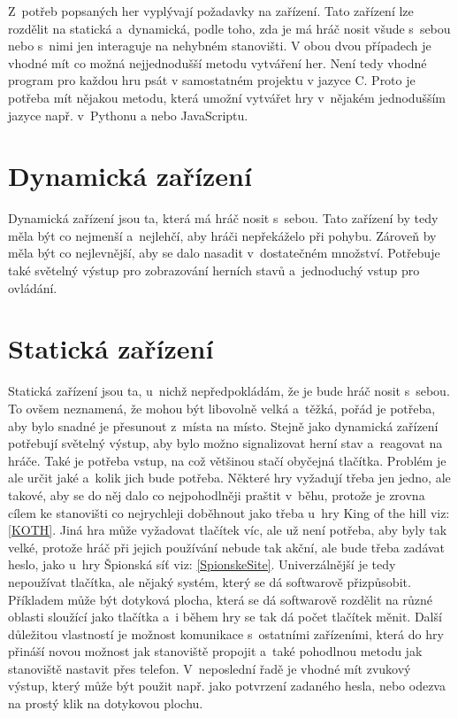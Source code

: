 Z~potřeb popsaných her vyplývají požadavky na zařízení.
Tato zařízení lze rozdělit na statická a~dynamická, podle toho, zda je má hráč nosit všude s~sebou nebo s~nimi jen interaguje na nehybném stanovišti.
V obou dvou případech je vhodné mít co možná nejjednodušší metodu vytváření her.
Není tedy vhodné program pro každou hru psát v samostatném projektu v jazyce C.
Proto je potřeba mít nějakou metodu, která umožní vytvářet hry v~nějakém jednodušším jazyce např. v~Pythonu a nebo JavaScriptu.

\section{Dynamická zařízení}
Dynamická zařízení jsou ta, která má hráč nosit s~sebou.
Tato zařízení by tedy měla být co nejmenší a~nejlehčí, aby hráči nepřekáželo při pohybu.
Zároveň by měla být co nejlevnější, aby se dalo nasadit v~dostatečném množství.
Potřebuje také světelný výstup pro zobrazování herních stavů a~jednoduchý vstup pro ovládání. 

\section{Statická zařízení}
Statická zařízení jsou ta, u~nichž nepředpokládám, že je bude hráč nosit s~sebou.
To ovšem neznamená, že mohou být libovolně velká a~těžká, pořád je potřeba, aby bylo snadné je přesunout z~místa na místo.
Stejně jako dynamická zařízení potřebují světelný výstup, aby bylo možno signalizovat herní stav a~reagovat na hráče.
Také je potřeba vstup, na což většinou stačí obyčejná tlačítka.
Problém je ale určit jaké a~kolik jich bude potřeba.
Některé hry vyžadují třeba jen jedno, ale takové, aby se do něj dalo co nejpohodlněji praštit v~běhu, protože je zrovna cílem ke stanovišti co nejrychleji doběhnout jako třeba u~hry King of the hill {viz: \ref{KOTH}}.
Jiná hra může vyžadovat tlačítek víc, ale už není potřeba, aby byly tak velké, protože hráč při jejich používání nebude tak akční, ale bude třeba zadávat heslo, jako u~hry Špionská síť {viz: \ref{SpionskeSite}}.
Univerzálnější je tedy nepoužívat tlačítka, ale nějaký systém, který se dá softwarově přizpůsobit.
Příkladem může být dotyková plocha, která se dá softwarově rozdělit na různé oblasti sloužící jako tlačítka a~i během hry se tak dá počet tlačítek měnit.
Další důležitou vlastností je možnost komunikace s~ostatními zařízeními, která do hry přináší novou možnost jak stanoviště propojit a~také pohodlnou metodu jak stanoviště nastavit přes telefon.
V~neposlední řadě je vhodné mít zvukový výstup, který může být použit např. jako potvrzení zadaného hesla, nebo odezva na prostý klik na dotykovou plochu.

